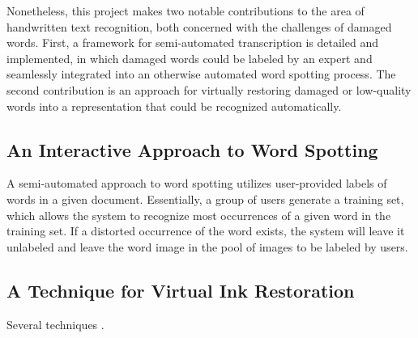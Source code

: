 \documentclass[final]{ukthesis}
\begin{document}
Nonetheless, this project makes two notable contributions to the area of handwritten text recognition, both concerned with the challenges of damaged words. First, a framework for semi-automated transcription is detailed and implemented, in which damaged words could be labeled by an expert and seamlessly integrated into an otherwise automated word spotting process. The second contribution is an approach for virtually restoring damaged or low-quality words into a representation that could be recognized automatically.


\subsection{An Interactive Approach to Word Spotting}
A semi-automated approach to word spotting utilizes user-provided labels of words in a given document. Essentially, a group of users generate a training set, which allows the system to recognize most occurrences of a given word in the training set. If a distorted occurrence of the word exists, the system will leave it unlabeled and leave the word image in the pool of images to be labeled by users.


\subsection{A Technique for Virtual Ink Restoration}
Several techniques .
\end{document}
